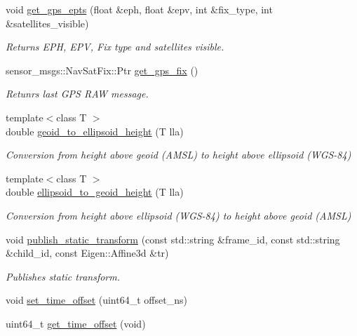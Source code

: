 \begin{DoxyCompactItemize}
void \mbox{\hyperlink{group__nodelib_ga17cd0e13d3dce3ec697646bb543ba6e7}{get\+\_\+gps\+\_\+epts}} (float \&eph, float \&epv, int \&fix\+\_\+type, int \&satellites\+\_\+visible)
\begin{DoxyCompactList}\small\item\em Returns E\+PH, E\+PV, Fix type and satellites visible. \end{DoxyCompactList}\item 
sensor\+\_\+msgs\+::\+Nav\+Sat\+Fix\+::\+Ptr \mbox{\hyperlink{group__nodelib_gac4ba509d29c876694293856f39308625}{get\+\_\+gps\+\_\+fix}} ()
\begin{DoxyCompactList}\small\item\em Retunrs last G\+PS R\+AW message. \end{DoxyCompactList}\item 
{\footnotesize template$<$class T $>$ }\\double \mbox{\hyperlink{group__nodelib_ga4f50b74e553d2c2b2a3c4ea02213fd89}{geoid\+\_\+to\+\_\+ellipsoid\+\_\+height}} (T lla)
\begin{DoxyCompactList}\small\item\em Conversion from height above geoid (A\+M\+SL) to height above ellipsoid (W\+G\+S-\/84) \end{DoxyCompactList}\item 
{\footnotesize template$<$class T $>$ }\\double \mbox{\hyperlink{group__nodelib_gaf8185c59b4aa8840717d676d247ea99d}{ellipsoid\+\_\+to\+\_\+geoid\+\_\+height}} (T lla)
\begin{DoxyCompactList}\small\item\em Conversion from height above ellipsoid (W\+G\+S-\/84) to height above geoid (A\+M\+SL) \end{DoxyCompactList}\item 
void \mbox{\hyperlink{group__nodelib_gab34a88daf20e38cb4ed8e26c6898704a}{publish\+\_\+static\+\_\+transform}} (const std\+::string \&frame\+\_\+id, const std\+::string \&child\+\_\+id, const Eigen\+::\+Affine3d \&tr)
\begin{DoxyCompactList}\small\item\em Publishes static transform. \end{DoxyCompactList}\item 
void \mbox{\hyperlink{group__nodelib_ga50b971d58f9196c4201a1a3213428e71}{set\+\_\+time\+\_\+offset}} (uint64\+\_\+t offset\+\_\+ns)
\item 
uint64\+\_\+t \mbox{\hyperlink{group__nodelib_ga1f582ffa4b83892e65bf2abff10e86e1}{get\+\_\+time\+\_\+offset}} (void)

\end{DoxyCompactItemize}
